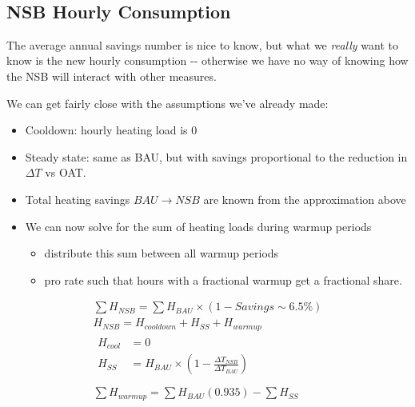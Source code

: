 \documentclass[11pt]{article}
\providecommand{\tightlist}{%
      \setlength{\itemsep}{0pt}\setlength{\parskip}{0pt}}
\begin{document}
    \begin{center}
    \end{center}
    { \hspace*{\fill} \\}
    
    \subsection{NSB Hourly Consumption}\label{nsb-hourly-consumption}

The average annual savings number is nice to know, but what we
\emph{really} want to know is the new hourly consumption -\/- otherwise
we have no way of knowing how the NSB will interact with other measures.

We can get fairly close with the assumptions we've already made:

\begin{itemize}
\tightlist
\item
  Cooldown: hourly heating load is 0
\item
  Steady state: same as BAU, but with savings proportional to the
  reduction in \(\Delta T\) vs OAT.
\item
  Total heating savings \(BAU \rightarrow NSB\) are known from the
  approximation above
\item
  We can now solve for the sum of heating loads during warmup periods

  \begin{itemize}
  \tightlist
  \item
    distribute this sum between all warmup periods
  \item
    pro rate such that hours with a fractional warmup get a fractional
    share.
  \end{itemize}
\end{itemize}

\begin{align}
\sum H_{NSB}    =\sum H_{BAU}\times(1-Savings\sim6.5\%)\\
H_{NSB} =H_{cooldown}+H_{SS}+H_{warmup}\\
\begin{aligned}H_{cool} &=0\\
H_{SS} & =H_{BAU}\times\left(1-\frac{\Delta T_{NSB}}{\Delta T_{BAU}}\right)\\
\end{aligned}\\
\sum H_{warmup} =\sum H_{BAU}(0.935)-\sum H_{SS}
\end{align}
\end{document}
